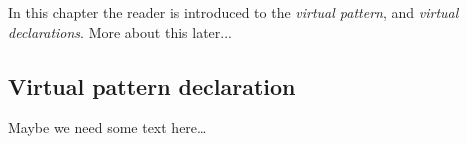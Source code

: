In this chapter the reader is introduced to the \emph{virtual
  pattern}, and \emph{virtual declarations}. More about this later...

\subsection*{Virtual pattern declaration}

Maybe we need some text here\dots